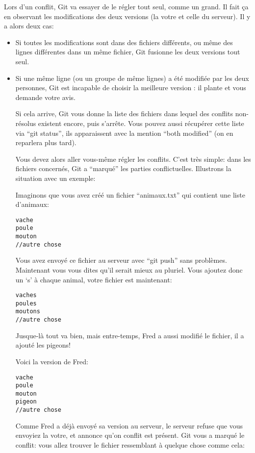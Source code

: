 \documentclass[10pt,a4paper]{article}
\begin{document}
Lors d'un conflit, Git va essayer de le régler tout seul, comme un grand. Il fait ça en observant les modifications des deux versions (la votre et celle du serveur). Il y a alors deux cas:

\begin{itemize}
\item Si toutes les modifications sont dans des fichiers différents, ou même des lignes différentes dans un même fichier, Git fusionne les deux versions tout seul.
\item Si une même ligne (ou un groupe de même lignes) a été modifiée par les deux personnes, Git est incapable de choisir la meilleure version : il plante et vous demande votre avis.

Si cela arrive, Git vous donne la liste des fichiers dans lequel des conflits non-résolus existent encore, puis s'arrête. Vous pouvez aussi récupérer cette liste via ``git status'', ils apparaissent avec la mention ``both modified'' (on en reparlera plus tard).

Vous devez alors aller vous-même régler les conflits. C'est très simple: dans les fichiers concernés, Git a ``marqué'' les parties conflictuelles. Illustrons la situation avec un exemple:

Imaginons que vous avez créé un fichier ``animaux.txt'' qui contient une liste d'animaux:

\begin{verbatim}
vache
poule
mouton
//autre chose
\end{verbatim}

Vous avez envoyé ce fichier au serveur avec ``git push'' sans problèmes. Maintenant vous vous dites qu'il serait mieux au pluriel. Vous ajoutez donc un `s' à chaque animal, votre fichier est maintenant:

\begin{verbatim}
vaches
poules
moutons
//autre chose
\end{verbatim}

Jusque-là tout va bien, mais entre-temps, Fred a aussi modifié le fichier, il a ajouté les pigeons!

Voici la version de Fred:

\begin{verbatim}
vache
poule
mouton
pigeon
//autre chose
\end{verbatim}

Comme Fred a déjà envoyé sa version au serveur, le serveur refuse que vous envoyiez la votre, et annonce qu'on conflit est présent. Git vous a marqué le conflit: vous allez trouver le fichier ressemblant à quelque chose comme cela:


\end{itemize}
\end{document}
